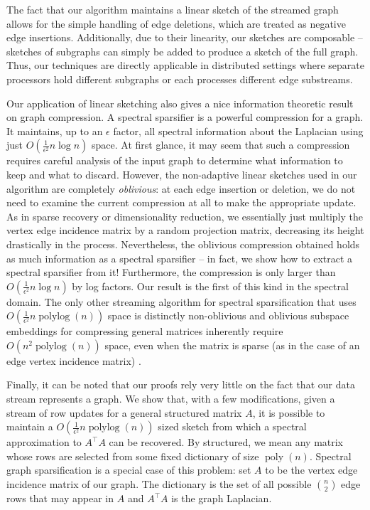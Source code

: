 \documentclass[11pt]{article}
\newcommand{\plog}{\mathop\mathrm{polylog}}
\newcommand{\poly}{\mathop\mathrm{poly}}
\begin{document}
The fact that our algorithm maintains a linear sketch of the streamed graph allows for the 
simple handling of edge deletions, which are treated as negative edge insertions. Additionally,  due to their linearity, our sketches are composable -- sketches of subgraphs can simply be added to produce a sketch of the full graph. Thus, our techniques are directly applicable in distributed settings where separate processors hold different subgraphs or each processes different edge substreams. 

Our application of linear sketching also gives a nice information theoretic result on graph compression. A spectral sparsifier is a powerful compression for a graph. It maintains, up to an $\epsilon$ factor, all spectral information about the Laplacian using just $O(\frac1{\epsilon^2}n\log n)$ space. At first glance, it may seem that such a compression requires careful analysis of the input graph to determine what information to keep and what to discard. However, the non-adaptive linear sketches used in our algorithm are completely \emph{oblivious}: at each edge insertion or deletion, we do not need to examine the current compression at all to make the appropriate update. As in sparse recovery or dimensionality reduction, we essentially just multiply the vertex edge incidence matrix by a random projection matrix, decreasing its height drastically in the process. Nevertheless, the oblivious compression obtained holds as much information as a spectral sparsifier -- in fact, we show how to extract a spectral sparsifier from it! Furthermore, the compression is only larger than $O(\frac1{\epsilon^2}n\log n)$ by log factors. Our result is the first of this kind in the spectral domain. The only other streaming algorithm for spectral sparsification that uses $O(\frac{1}{\epsilon^2}n\plog (n))$ space is distinctly non-oblivious \cite{kelner2011spectral} and oblivious subspace embeddings for compressing general matrices inherently require $O(n^2 \plog (n))$ space, even when the matrix is sparse (as in the case of an edge vertex incidence matrix) \cite{sarlos2006improved,clarkson2013low, meng2013, osnap}.

Finally, it can be noted that our proofs rely very little on the fact that our data stream represents a graph. We show that, with a few modifications, given a stream of row updates for a general structured matrix $A$, it is possible to maintain a $O(\frac1{\epsilon^2} n \plog(n))$ sized sketch from which a spectral approximation to $A^\top A$ can be recovered. By structured, we mean any matrix whose rows are selected from some fixed dictionary of size $\poly(n)$. Spectral graph sparsification is a special case of this problem: set $A$ to be the vertex edge incidence matrix of our graph. The dictionary is the set of all possible ${n\choose 2}$ edge rows that may appear in $A$ and $A^\top A$ is the graph Laplacian.  
\end{document}
